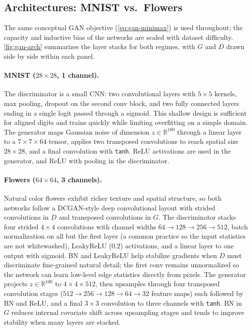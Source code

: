\documentclass{article}
\theoremstyle{plain}
\theoremstyle{definition}
\theoremstyle{remark}
\begin{document}
\subsection{Architectures: MNIST vs.\ Flowers}


The same conceptual GAN objective (\cref{eq:gan-minimax}) is used throughout; the capacity and inductive bias of the networks are scaled with dataset difficulty.
\cref{fig:gan-arch} summarizes the layer stacks for both regimes, with $G$ and $D$ drawn side by side within each panel.

\paragraph{MNIST ($28\times 28$, 1 channel).}
The discriminator is a small CNN: two convolutional layers with $5\times 5$ kernels, max pooling, dropout on the second conv block, and two fully connected layers ending in a single logit passed through a sigmoid. This shallow design is sufficient for aligned digits and trains quickly while limiting overfitting on a simple domain.
The generator maps Gaussian noise of dimension $z\in\mathbb{R}^{100}$ through a linear layer to a $7\times 7\times 64$ tensor, applies two transposed convolutions to reach spatial size $28\times 28$, and a final convolution with \texttt{tanh}. ReLU activations are used in the generator, and ReLU with pooling in the discriminator.

\paragraph{Flowers ($64\times 64$, 3 channels).}
Natural color flowers exhibit richer texture and spatial structure, so both networks follow a DCGAN-style deep convolutional layout with strided convolutions in $D$ and transposed convolutions in $G$.
The discriminator stacks four strided $4\times 4$ convolutions with channel widths $64\!\to\!128\!\to\!256\!\to\!512$, batch normalization on all but the first layer (a common practice so the input statistics are not whitewashed), LeakyReLU ($0.2$) activations, and a linear layer to one output with sigmoid. BN and LeakyReLU help stabilize gradients when $D$ must discriminate fine-grained natural detail; the first conv remains unnormalized so the network can learn low-level edge statistics directly from pixels.
The generator projects $z\in\mathbb{R}^{100}$ to $4\times 4\times 512$, then upsamples through four transposed convolution stages ($512\!\to\!256\!\to\!128\!\to\!64\!\to\!32$ feature maps) each followed by BN and ReLU, and a final $3\times 3$ convolution to three channels with \texttt{tanh}. BN in $G$ reduces internal covariate shift across upsampling stages and tends to improve stability when many layers are stacked.
\end{document}

